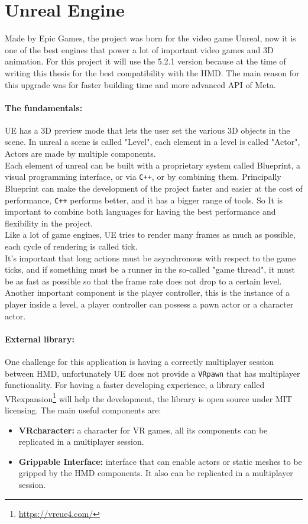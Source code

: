 \section{Unreal Engine}
\noindent
Made by Epic Games, the project was born for the video game Unreal,
now it is one of the best engines that power a lot of important video games and 3D animation. 
For this project it will use the 5.2.1 version because at the time of writing this thesis for the best compatibility with the \ac{HMD}. 
The main reason for this upgrade was for faster building time and more advanced \ac{API} of Meta. 

\paragraph{The fundamentals:}
\ac{UE} has a 3D preview mode that lets the user set the various 3D objects in the scene.
In unreal a scene is called "Level", each element in a level is called "Actor", Actors are made by multiple components.\\
Each element of unreal can be built with a proprietary system called Blueprint, a visual programming interface, or via \texttt{C++}, or by combining them.
Principally Blueprint can make the development of the project faster and easier at the cost of performance, \texttt{C++} performs better, and it has a bigger range of tools.
So It is important to combine both languages for having the best performance and flexibility in the project.\\
Like a lot of game engines, \ac{UE} tries to render many frames as much as possible, each cycle of rendering is called tick.\\
It's important that long actions must be asynchronous with respect to the game ticks, and if something must be a runner in the so-called "game thread", it must be as fast as possible so that the frame rate does not drop to a certain level.\\
Another important component is the player controller, this is the instance of a player inside a level, a player controller can possess a pawn actor or a character actor.


\paragraph{External library:}
One challenge for this application is having a correctly multiplayer session between \ac{HMD}, unfortunately \ac{UE} does not provide a \texttt{VRpawn} that has multiplayer functionality.
For having a faster developing experience, a library called VRexpansion\footnote{\url{https://vreue4.com/}} will help the development, the library is open source under MIT licensing.
The main useful components are:
\begin{itemize}
  \item \textbf{VRcharacter:} a character for \ac{VR} games, all its components can be replicated in a multiplayer session.
  \item \textbf{Grippable Interface:}  interface that can enable actors or static meshes to be gripped by the \ac{HMD} components. It also can be replicated in a multiplayer session.
\end{itemize}

